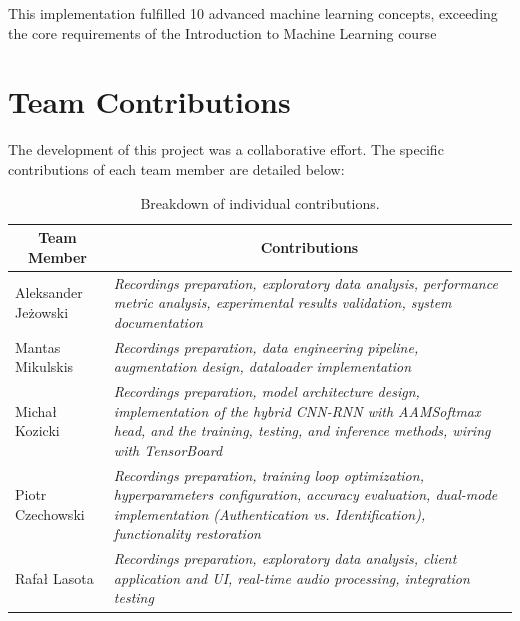 \documentclass[12pt,a4paper]{article}
\begin{document}
\noindent This implementation fulfilled 10 advanced machine learning concepts, exceeding the core requirements of the Introduction to Machine Learning course



\section{Team Contributions}

The development of this project was a collaborative effort. The specific contributions of each team member are detailed below:

\begin{table}[H]
\centering
\begin{tabular}{|l|p{13cm}|}
\hline
\multicolumn{1}{|c|}{\textbf{Team Member}} & 
\multicolumn{1}{c|}{\textbf{Contributions}} \\
\hline
Aleksander Jeżowski & 
    \textit{Recordings preparation, 
    exploratory data analysis,
    performance metric analysis, 
    experimental results validation,
    system documentation} \\
\hline
Mantas Mikulskis &
    \textit{Recordings preparation, 
    data engineering pipeline,
    augmentation design,
    dataloader implementation} \\
\hline
Michał Kozicki &
    \textit{Recordings preparation, 
    model architecture design,
    implementation of the hybrid CNN-RNN with AAMSoftmax head, and
    the training, testing, and inference methods,
    wiring with TensorBoard
    } \\
\hline  
Piotr Czechowski &
    \textit{Recordings preparation, 
    training loop optimization,
    hyperparameters configuration,
    accuracy evaluation,
    dual-mode implementation (Authentication vs. Identification),
    functionality restoration} \\

\hline
Rafał Lasota &
    \textit{Recordings preparation, 
    exploratory data analysis,
    client application and UI,
    real-time audio processing,
    integration testing} \\
\hline
\end{tabular}
\caption{Breakdown of individual contributions.}
\end{table}
\end{document}
